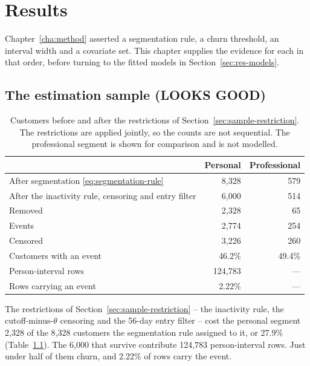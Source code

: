 \chapter{Results}
\label{cha:results}

 
Chapter~\ref{cha:method} asserted a segmentation rule, a churn threshold, an interval width and a covariate set. This chapter supplies the evidence for each in that order, before turning to the fitted models in Section~\ref{sec:res-models}.
 
\section{The estimation sample (LOOKS GOOD)}
\label{sec:res-attrition}
\label{sec:res-segmentation}
\label{sec:res-activity-mix}


 \begin{table}[htbp]
\centering
\small
\begin{tabular}{@{}lrr@{}}
\toprule
& Personal & Professional \\
\midrule
After segmentation \eqref{eq:segmentation-rule} & 8{,}328 & 579 \\
After the inactivity rule, censoring and entry filter & 6{,}000 & 514 \\
Removed & 2{,}328 & 65 \\
\addlinespace
Events    & 2{,}774 & 254 \\
Censored  & 3{,}226 & 260 \\
Customers with an event & 46.2\% & 49.4\% \\
\addlinespace
Person-interval rows & 124{,}783& --- \\
Rows carrying an event & 2.22\% & --- \\
\bottomrule
\end{tabular}
\caption{Customers before and after the restrictions of Section~\ref{sec:sample-restriction}. The restrictions are applied jointly, so the counts are not sequential. The professional segment is shown for comparison and is not modelled.}
\label{tab:attrition}
\end{table}
 
The restrictions of Section~\ref{sec:sample-restriction} -- the inactivity rule, the cutoff-minus-$\theta$ censoring and the 56-day entry filter -- cost the personal segment 2{,}328 of the 8{,}328 customers the segmentation rule assigned to it, or 27.9\% (Table~\ref{tab:attrition}). The 6{,}000 that survive contribute 124{,}783 person-interval rows. Just under half of them churn, and 2.22\% of rows carry the event.

